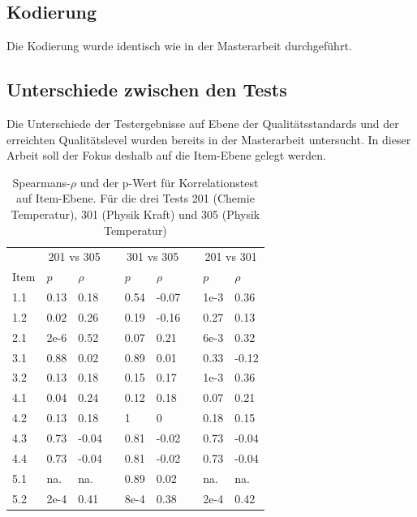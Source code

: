 \subsection{Kodierung}

Die Kodierung wurde identisch wie in der Masterarbeit \citep{Sichau2015a} durchgeführt.

\subsection{Unterschiede zwischen den Tests}

Die Unterschiede der Testergebnisse auf Ebene der Qualitätsstandards und der erreichten Qualitätslevel wurden bereits in der Masterarbeit untersucht. In dieser Arbeit soll der Fokus deshalb auf die Item-Ebene gelegt werden.

\begin{table}[htbp]
  \centering
\begin{tabular}{@{}lllllllll@{}}
\toprule   &  \multicolumn{2}{c}{201 vs 305} &&  \multicolumn{2}{c}{301 vs 305}  && \multicolumn{2}{c}{201 vs 301}\\
 \cmidrule{2-3}  \cmidrule{5-6} \cmidrule{8-9}
Item  & $p$ & $\rho$ &&  $p$ & $\rho$ &&  $p$ & $\rho$\\
\midrule
 1.1 & 0.13 & 0.18  && 0.54 & -0.07 && 1e-3 & 0.36 \\ 
 1.2 & 0.02 & 0.26  && 0.19 & -0.16 && 0.27 & 0.13 \\ 
 2.1 & 2e-6 & 0.52  && 0.07 & 0.21  && 6e-3 & 0.32\\ 
 3.1 & 0.88 & 0.02  && 0.89 & 0.01  && 0.33 & -0.12\\ 
 3.2 & 0.13 & 0.18  && 0.15 & 0.17  && 1e-3 & 0.36\\ 
 4.1 & 0.04 & 0.24 && 0.12 & 0.18  	&& 0.07 & 0.21 \\ 
 4.2 & 0.13 & 0.18 && 1 & 0  		&& 0.18 & 0.15 \\ 
 4.3 & 0.73 & -0.04  && 0.81 & -0.02  && 0.73 & -0.04 \\ 
 4.4 & 0.73 & -0.04  && 0.81 & -0.02  && 0.73 & -0.04 \\ 
 5.1 & na. & na.  && 0.89 & 0.02  	&& na. & na. \\ 
 5.2 & 2e-4 & 0.41  && 8e-4 & 0.38  && 2e-4 & 0.42 \\ 
\bottomrule

\end{tabular} 
  \caption{Spearmans-$\rho$ und der p-Wert für Korrelationstest auf Item-Ebene. Für die drei Tests 201 (Chemie Temperatur), 301 (Physik Kraft) und 305 (Physik Temperatur)}
  \label{tab:cor}
\end{table}

